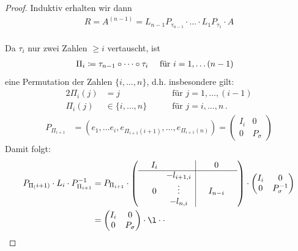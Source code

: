\documentclass[ngerman,fontsize=11pt, paper=a4, parskip=half, titlepage=true, toc=bib]{scrbook}
\theoremstyle{definition}
\theoremstyle{plain}
\begin{document}
\begin{proof}
  Induktiv erhalten wir dann
  \begin{gather*}
    R = A^{(n-1)} = L_{n-1}P_{\tau_{n-1}} \cdot \dotsc \cdot L_1 P_{\tau_1} \cdot A
  \end{gather*}\\
  Da $\tau_i$ nur zwei Zahlen $\geq i $ vertauscht, ist
  \begin{align*}\index{Vorwärtselimination}
    \Pi_i  &\coloneqq \tau_{n-1} \circ \dots \circ \tau_i \quad\text{ für } i=1,\dots (n-1) 
  \end{align*}
  eine Permutation der Zahlen $\{i,\dots, n\}$, d.h. insbesondere gilt:
  \begin{alignat*}{2}
    \Pi_i(j)&=j  & \quad &\text{ für } j=1,\dots,(i-1) \\
    \Pi_i(j)&\in \{i, \dots, n\} & &\text{~für~}j=i,\dots, n\,. 
  \end{alignat*}
  \begin{align*}
    P _{\Pi_{i+1}}  &= (e_1, \dotsc e_i, e_{\Pi_{i+1}(i+1)}, \dotsc, e_{\Pi_{i+1}(n)}) 
                      = \begin{pmatrix}
                        I_i & 0 \\
                        0 & P_{\sigma}
                      \end{pmatrix}
  \end{align*}
  Damit folgt:
  \begin{align*}
    P_{\Pi_(i+1)}\cdot L_i\cdot P_{\Pi_{i+1}}^{-1}
    &= P_{\Pi_{i+1}} \cdot 
      \left(\begin{array}{ccc|ccc}
              & I_i & && 0 & \\
              \cline{1-6}
              & & -l_{i+1, i} & & & \\
              &  0 &  \vdots  & & I_{n-i} &\\
              &    & -l_{n, i} & &  & 
            \end{array}\right)
                                      \cdot\begin{pmatrix}
                                        I_i & 0 \\
                                        0 & P_{\sigma}^{-1}
                                      \end{pmatrix}\\
    &= \begin{pmatrix}
      I_i & 0 \\
      0 & P_{\sigma}
    \end{pmatrix}
          \cdot   \l\cdot  \cdot

\end{align*}
\end{proof}
\end{document}
